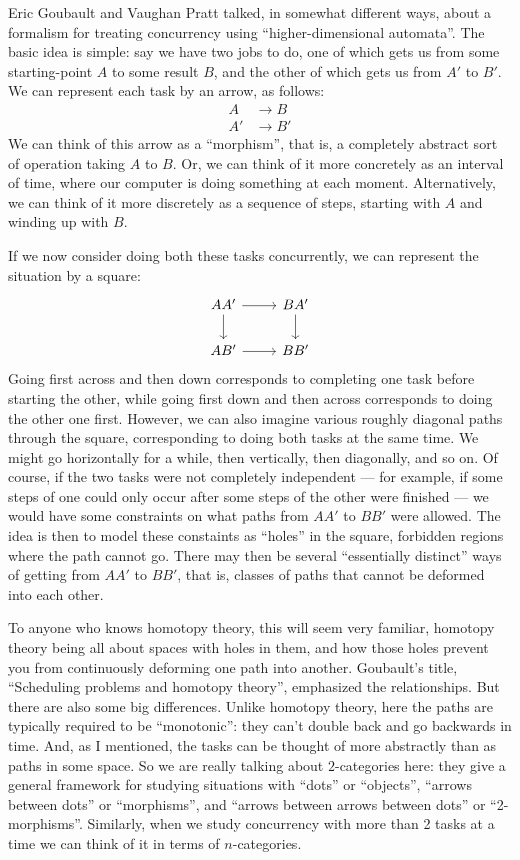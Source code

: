\documentclass{article}
\begin{document}
Eric Goubault and Vaughan Pratt talked, in somewhat different ways,
about a formalism for treating concurrency using ``higher-dimensional
automata''. The basic idea is simple: say we have two jobs to do, one of
which gets us from some starting-point \(A\) to some result \(B\), and
the other of which gets us from \(A'\) to \(B'\). We can represent each
task by an arrow, as follows: \[
  \begin{aligned}
    A&\longrightarrow B
  \\A'&\longrightarrow B'
  \end{aligned}
\] We can think of this arrow as a ``morphism'', that is, a completely
abstract sort of operation taking \(A\) to \(B\). Or, we can think of it
more concretely as an interval of time, where our computer is doing
something at each moment. Alternatively, we can think of it more
discretely as a sequence of steps, starting with \(A\) and winding up
with \(B\).

If we now consider doing both these tasks concurrently, we can represent
the situation by a square: \[
  \begin{tikzcd}
    AA' \rar\dar & BA' \dar
  \\AB' \rar & BB'
  \end{tikzcd}
\] Going first across and then down corresponds to completing one task
before starting the other, while going first down and then across
corresponds to doing the other one first. However, we can also imagine
various roughly diagonal paths through the square, corresponding to
doing both tasks at the same time. We might go horizontally for a while,
then vertically, then diagonally, and so on. Of course, if the two tasks
were not completely independent --- for example, if some steps of one
could only occur after some steps of the other were finished --- we
would have some constraints on what paths from \(AA'\) to \(BB'\) were
allowed. The idea is then to model these constaints as ``holes'' in the
square, forbidden regions where the path cannot go. There may then be
several ``essentially distinct'' ways of getting from \(AA'\) to
\(BB'\), that is, classes of paths that cannot be deformed into each
other.

To anyone who knows homotopy theory, this will seem very familiar,
homotopy theory being all about spaces with holes in them, and how those
holes prevent you from continuously deforming one path into another.
Goubault's title, ``Scheduling problems and homotopy theory'',
emphasized the relationships. But there are also some big differences.
Unlike homotopy theory, here the paths are typically required to be
``monotonic'': they can't double back and go backwards in time. And, as
I mentioned, the tasks can be thought of more abstractly than as paths
in some space. So we are really talking about \(2\)-categories here:
they give a general framework for studying situations with ``dots'' or
``objects'', ``arrows between dots'' or ``morphisms'', and ``arrows
between arrows between dots'' or ``2-morphisms''. Similarly, when we
study concurrency with more than 2 tasks at a time we can think of it in
terms of \(n\)-categories.
\end{document}
